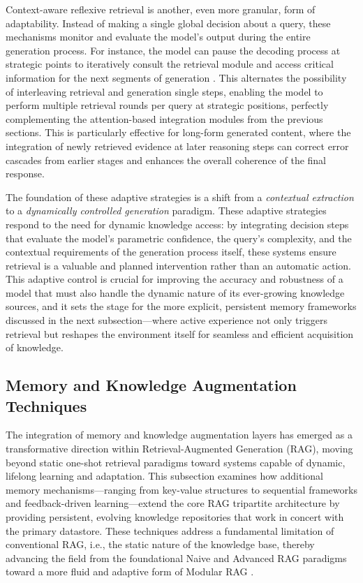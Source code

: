 \documentclass[11pt]{article}
\begin{document}
Context-aware reflexive retrieval is another, even more granular, form of adaptability. Instead of making a single global decision about a query, these mechanisms monitor and evaluate the model's output during the entire generation process. For instance, the model can pause the decoding process at strategic points to iteratively consult the retrieval module and access critical information for the next segments of generation \cite{ref49,ref50}. This alternates the possibility of interleaving retrieval and generation single steps, enabling the model to perform multiple retrieval rounds per query at strategic positions, perfectly complementing the attention-based integration modules from the previous sections. This is particularly effective for long-form generated content, where the integration of newly retrieved evidence at later reasoning steps can correct error cascades from earlier stages and enhances the overall coherence of the final response.

The foundation of these adaptive strategies is a shift from a \emph{contextual extraction} to a \emph{dynamically controlled generation} paradigm. These adaptive strategies respond to the need for dynamic knowledge access: by integrating decision steps that evaluate the model's parametric confidence, the query's complexity, and the contextual requirements of the generation process itself, these systems ensure retrieval is a valuable and planned intervention rather than an automatic action. This adaptive control is crucial for improving the accuracy and robustness of a model that must also handle the dynamic nature of its ever-growing knowledge sources, and it sets the stage for the more explicit, persistent memory frameworks discussed in the next subsection---where active experience not only triggers retrieval but reshapes the environment itself for seamless and efficient acquisition of knowledge.

\subsection{Memory and Knowledge Augmentation Techniques}

The integration of memory and knowledge augmentation layers has emerged as a transformative direction within Retrieval-Augmented Generation (RAG), moving beyond static one-shot retrieval paradigms toward systems capable of dynamic, lifelong learning and adaptation. This subsection examines how additional memory mechanisms---ranging from key-value structures to sequential frameworks and feedback-driven learning---extend the core RAG tripartite architecture by providing persistent, evolving knowledge repositories that work in concert with the primary datastore. These techniques address a fundamental limitation of conventional RAG, i.e., the static nature of the knowledge base, thereby advancing the field from the foundational Naive and Advanced RAG paradigms toward a more fluid and adaptive form of Modular RAG \cite{ref1,ref2}.
\end{document}
